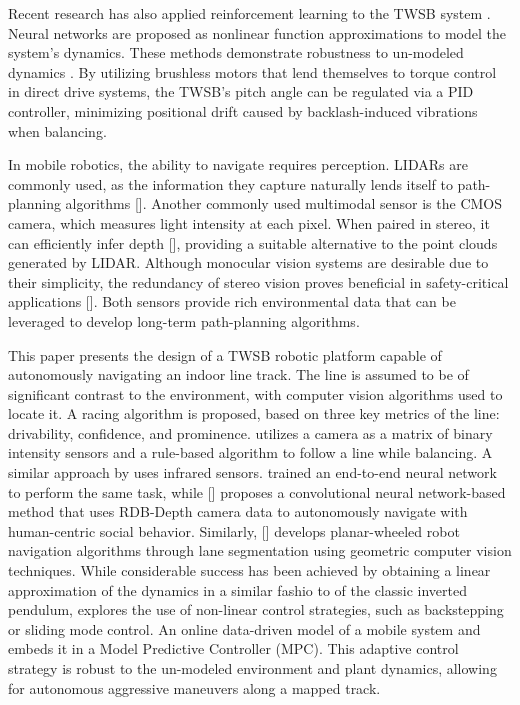     Recent research has also applied reinforcement learning to the TWSB system \cite{kober2013reinforcement}.
    Neural networks are proposed as nonlinear function approximations to model the system's dynamics. 
    These methods demonstrate robustness to un-modeled dynamics \cite{guo2021optimal}. By utilizing 
    brushless motors that lend themselves to torque control in direct drive systems, the TWSB’s pitch 
    angle can be regulated via a PID controller, minimizing positional drift caused by backlash-induced 
    vibrations when balancing.
    
    In mobile robotics, the ability to navigate requires perception. LIDARs are commonly used, as  
    the information they capture naturally lends itself to path-planning algorithms [].
    Another commonly used multimodal sensor is the CMOS camera, which measures light intensity at each pixel. 
    When paired in stereo, it can efficiently infer depth [], providing a suitable alternative to the point 
    clouds generated by LIDAR. Although monocular vision systems are desirable due to their simplicity, 
    the redundancy of stereo vision proves beneficial in safety-critical applications [].
    Both sensors provide rich environmental data that can be leveraged to develop long-term path-planning algorithms.
    
    This paper presents the design of a TWSB robotic platform capable of autonomously navigating an 
    indoor line track. The line is assumed to be of significant contrast to the environment, with computer 
    vision algorithms used to locate it. A racing algorithm is proposed,
    based on three key metrics of the line: drivability, confidence, and prominence.
    \cite{visionlinetwsb} utilizes a camera as a matrix of binary intensity sensors and a rule-based 
    algorithm to follow a line while balancing. A similar approach by \cite{ghani2011two} uses infrared sensors. 
    \cite{nntwsbvision} trained an end-to-end neural network to perform the same task, while [] proposes a 
    convolutional neural network-based method that uses RDB-Depth camera data to autonomously 
    navigate with human-centric social behavior. Similarly, [] develops planar-wheeled robot navigation 
    algorithms through lane segmentation using geometric computer vision techniques.
    While considerable success has been achieved by obtaining a linear approximation of the dynamics in a similar fashio to 
    of the classic inverted pendulum, \cite{AdvancedWIP} explores the use of non-linear control strategies, such as backstepping or 
    sliding mode control. An online data-driven model of a mobile system and embeds it 
    in a Model Predictive Controller (MPC). This adaptive control strategy is robust to the un-modeled 
    environment and plant dynamics, allowing for autonomous aggressive maneuvers along a mapped track.
    
